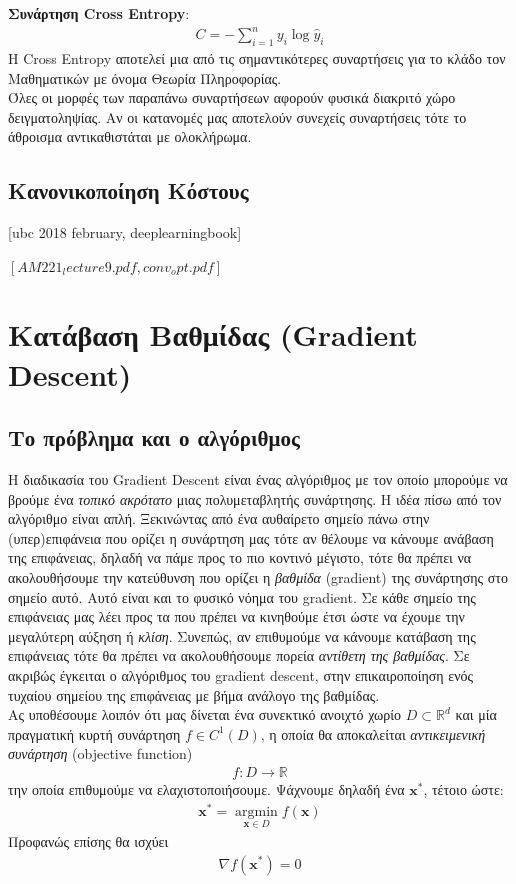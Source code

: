 \documentclass[11pt]{article} %
\numberwithin{equation}{subsection}
\begin{document}
\textbf{Συνάρτηση Cross Entropy}:
\begin{align*}
\displaystyle C = -\sum_{i=1}^{n} y_i \log{\hat{y}_i}
\end{align*}
Η Cross Entropy αποτελεί μια από τις σημαντικότερες συναρτήσεις για το κλάδο τον Μαθηματικών με όνομα Θεωρία Πληροφορίας.\\

Όλες οι μορφές των παραπάνω συναρτήσεων αφορούν φυσικά διακριτό χώρο δειγματοληψίας. Αν οι κατανομές μας αποτελούν συνεχείς συναρτήσεις τότε το άθροισμα αντικαθιστάται με ολοκλήρωμα.\\

\subsection{Κανονικοποίηση Κόστους}
[ubc 2018 february, deeplearningbook]


$[ΑΜ221_lecture9.pdf, conv_opt.pdf]$
\section{Κατάβαση Βαθμίδας (Gradient Descent)}
\subsection{Το πρόβλημα και ο αλγόριθμος}
Η διαδικασία του Gradient Descent είναι ένας αλγόριθμος με τον οποίο μπορούμε να βρούμε ένα \textit{τοπικό ακρότατο} μιας πολυμεταβλητής συνάρτησης. Η ιδέα πίσω από τον αλγόριθμο είναι απλή. Ξεκινώντας από ένα αυθαίρετο σημείο πάνω στην (υπερ)επιφάνεια που ορίζει η συνάρτηση μας τότε αν θέλουμε να κάνουμε ανάβαση της επιφάνειας, δηλαδή να πάμε προς το πιο κοντινό μέγιστο, τότε θα πρέπει να ακολουθήσουμε την κατεύθυνση που ορίζει η \textit{βαθμίδα} (gradient) της συνάρτησης στο σημείο αυτό. Αυτό είναι και το φυσικό νόημα του gradient. Σε κάθε σημείο της επιφάνειας μας λέει προς τα που πρέπει να κινηθούμε έτσι ώστε να έχουμε την μεγαλύτερη αύξηση ή \textit{κλίση}. Συνεπώς, αν επιθυμούμε να κάνουμε κατάβαση της επιφάνειας τότε θα πρέπει να ακολουθήσουμε πορεία \textit{αντίθετη της βαθμίδας}. Σε ακριβώς έγκειται ο αλγόριθμος του gradient descent, στην επικαιροποίηση ενός τυχαίου σημείου της επιφάνειας με βήμα ανάλογο της βαθμίδας.\\

Ας υποθέσουμε λοιπόν ότι μας δίνεται ένα συνεκτικό ανοιχτό χωρίο $D \subset \mathbb{R}^d$ και μία πραγματική κυρτή συνάρτηση $f \in C^1 (D)$, η οποία θα αποκαλείται \textit{αντικειμενική συνάρτηση} (objective function)
\begin{align*}
f : D \rightarrow \mathbb{R}
\end{align*}
την οποία επιθυμούμε να ελαχιστοποιήσουμε. Ψάχνουμε δηλαδή ένα $\textbf{x}^*$, τέτοιο ώστε:
\begin{align*}
\textbf{x}^* =  \operatorname*{argmin}_{\textbf{x} \in D} f(\textbf{x})
\end{align*}
Προφανώς επίσης θα ισχύει
\begin{align*}
\nabla f(\textbf{x}^*) = 0
\end{align*}
\end{document}
